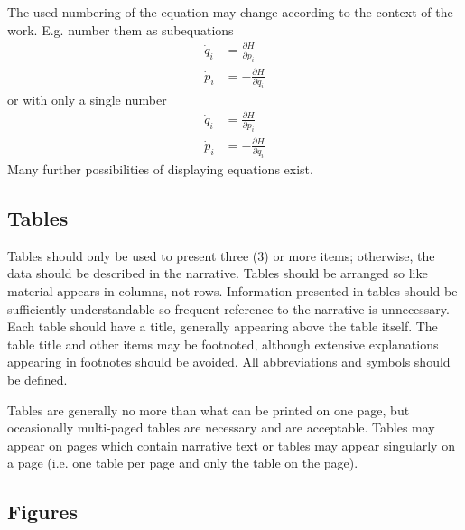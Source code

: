 The used numbering of the equation may change according to the context of the work. E.g. number them as subequations
\begin{subequations}
\begin{align}
  \dot{q}_i & = \frac{\partial H}{\partial p_i} \\
  \dot{p}_i & = -\frac{\partial H}{\partial q_i} 
\end{align}
\end{subequations}
or with only a single number
\begin{equation}
\begin{aligned}
  \dot{q}_i & = \frac{\partial H}{\partial p_i} \\
  \dot{p}_i & = -\frac{\partial H}{\partial q_i} 
\end{aligned}
\end{equation}
Many further possibilities of displaying equations exist.


\subsection{Tables}
\label{sec:tables}

Tables should only be used to present three (3) or more items; otherwise, the data should be described in the narrative. Tables should be arranged so like material appears in columns, not rows. Information presented in tables should be sufficiently understandable so frequent reference to the narrative is unnecessary. Each table should have a title, generally appearing above the table itself. The table title and other items may be footnoted, although extensive explanations appearing in footnotes should be avoided. All abbreviations and symbols should be defined.

Tables are generally no more than what can be printed on one page, but occasionally multi-paged tables are necessary and are acceptable. Tables may appear on pages which contain narrative text or tables may appear singularly on a page (i.e. one table per page and only the table on the page).


\subsection{Figures}
\label{sec:figures}


